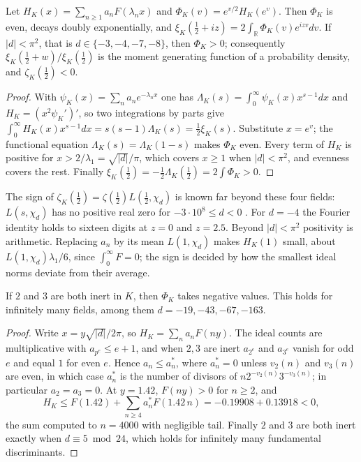 \begin{theorem}\label{thm:sf:kernel}
Let $H_K(x)=\sum_{n\ge1}a_nF(\lambda_nx)$ and $\Phi_K(v)=e^{v/2}H_K(e^v)$. Then $\Phi_K$ is even, decays doubly exponentially, and $\xi_K(\frac12+iz)=2\int_{\mathbb R}\Phi_K(v)e^{izv}dv$. If $|d|<\pi^2$, that is $d\in\{-3,-4,-7,-8\}$, then $\Phi_K>0$; consequently $\xi_K(\frac12+w)/\xi_K(\frac12)$ is the moment generating function of a probability density, and $\zeta_K(\frac12)<0$.
\end{theorem}

\begin{proof}
With $\psi_K(x)=\sum_na_ne^{-\lambda_nx}$ one has $\Lambda_K(s)=\int_0^\infty\psi_K(x)x^{s-1}dx$ and $H_K=(x^2\psi_K')'$, so two integrations by parts give $\int_0^\infty H_K(x)x^{s-1}dx=s(s-1)\Lambda_K(s)=\frac12\xi_K(s)$. Substitute $x=e^v$; the functional equation $\Lambda_K(s)=\Lambda_K(1-s)$ makes $\Phi_K$ even. Every term of $H_K$ is positive for $x>2/\lambda_1=\sqrt{|d|}/\pi$, which covers $x\ge1$ when $|d|<\pi^2$, and evenness covers the rest. Finally $\xi_K(\frac12)=-\frac12\Lambda_K(\frac12)=2\int\Phi_K>0$.
\end{proof}

The sign of $\zeta_K(\frac12)=\zeta(\frac12)L(\frac12,\chi_d)$ is known far beyond these four fields: $L(s,\chi_d)$ has no positive real zero for $-3\cdot10^8\le d<0$ \cite{watkins2004}. For $d=-4$ the Fourier identity holds to sixteen digits at $z=0$ and $z=2.5$. Beyond $|d|<\pi^2$ positivity is arithmetic. Replacing $a_n$ by its mean $L(1,\chi_d)$ makes $H_K(1)$ small, about $L(1,\chi_d)\lambda_1/6$, since $\int_0^\infty F=0$; the sign is decided by how the smallest ideal norms deviate from their average.

\begin{theorem}\label{thm:sf:inert}
If $2$ and $3$ are both inert in $K$, then $\Phi_K$ takes negative values. This holds for infinitely many fields, among them $d=-19,-43,-67,-163$.
\end{theorem}

\begin{proof}
Write $x=y\sqrt{|d|}/2\pi$, so $H_K=\sum_na_nF(ny)$. The ideal counts are multiplicative with $a_{p^e}\le e+1$, and when $2,3$ are inert $a_{2^e}$ and $a_{3^e}$ vanish for odd $e$ and equal $1$ for even $e$. Hence $a_n\le a_n^*$, where $a_n^*=0$ unless $v_2(n)$ and $v_3(n)$ are even, in which case $a_n^*$ is the number of divisors of $n2^{-v_2(n)}3^{-v_3(n)}$; in particular $a_2=a_3=0$. At $y=1.42$, $F(ny)>0$ for $n\ge2$, and
\[
H_K\le F(1.42)+\sum_{n\ge4}a_n^*F(1.42\,n)=-0.19908+0.13918<0,
\]
the sum computed to $n=4000$ with negligible tail. Finally $2$ and $3$ are both inert exactly when $d\equiv5\bmod24$, which holds for infinitely many fundamental discriminants.
\end{proof}

